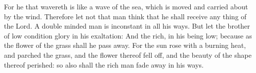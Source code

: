 For he that wavereth is like a wave of the sea, which is moved and carried about by the wind.
Therefore let not that man think that he shall receive any thing of the Lord.
A double minded man is inconstant in all his ways.
But let the brother of low condition glory in his exaltation:
And the rich, in his being low; because as the flower of the grass shall he pass away.
For the sun rose with a burning heat, and parched the grass, and the flower thereof fell off, and the beauty of the shape thereof perished: so also shall the rich man fade away in his ways.
